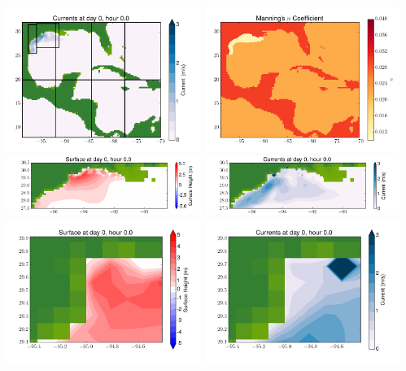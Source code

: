 \documentclass[11pt]{article}
\begin{document}
\includegraphics[width=0.475\textwidth]{frame0012fig2.png}
\vskip 10pt 
\includegraphics[width=0.475\textwidth]{frame0012fig3.png}
\includegraphics[width=0.475\textwidth]{frame0012fig4.png}
\vskip 10pt 
\includegraphics[width=0.475\textwidth]{frame0012fig5.png}
\includegraphics[width=0.475\textwidth]{frame0012fig6.png}
\vskip 10pt 
\includegraphics[width=0.475\textwidth]{frame0012fig7.png}
\end{document}
